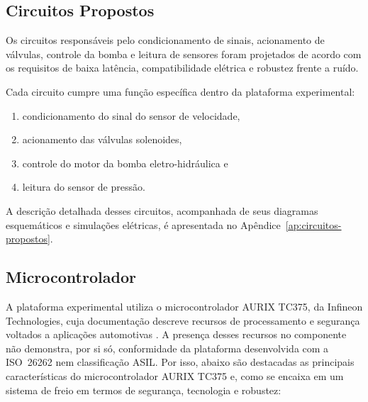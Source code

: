 \subsection{Circuitos Propostos}
\label{sec:metodologia-6-1}

Os circuitos responsáveis pelo condicionamento de sinais, acionamento de válvulas, controle da bomba e leitura de sensores foram projetados de acordo com os requisitos de baixa latência, compatibilidade elétrica e robustez frente a ruído. 

Cada circuito cumpre uma função específica dentro da plataforma experimental: 
\begin{enumerate}
    \item  condicionamento do sinal do sensor de velocidade,
    \item  acionamento das válvulas solenoides,
    \item  controle do motor da bomba eletro-hidráulica e
    \item  leitura do sensor de pressão.
\end{enumerate}

A descrição detalhada desses circuitos, acompanhada de seus diagramas esquemáticos e simulações elétricas, é apresentada no Apêndice~\ref{ap:circuitos-propostos}.

\subsection{Microcontrolador}
\label{sec:metodologia-6-5}

A plataforma experimental utiliza o microcontrolador AURIX TC375, da Infineon Technologies, cuja documentação descreve recursos de processamento e segurança voltados a aplicações automotivas . A presença desses recursos no componente não demonstra, por si só, conformidade da plataforma desenvolvida com a ISO~26262 nem classificação \gls{ASIL}. Por isso, abaixo são destacadas as principais características do microcontrolador AURIX TC375 e, como se encaixa em um sistema de freio em termos de segurança, tecnologia e robustez:

